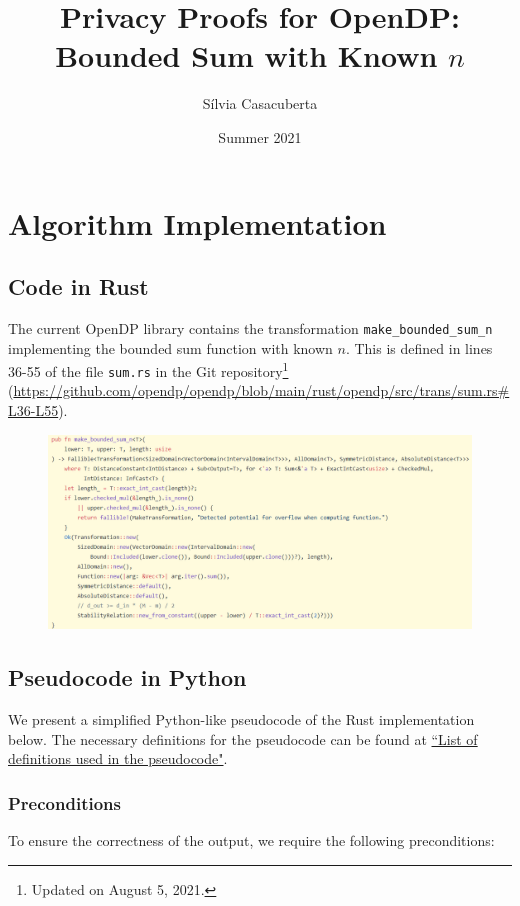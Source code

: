 \documentclass[11pt,a4paper]{article}
\title{Privacy Proofs for OpenDP: Bounded Sum with Known $n$}
\author{S\'ilvia Casacuberta}
\date{Summer 2021}
\theoremstyle{definition}
\begin{document}
\maketitle

\tableofcontents

\section{Algorithm Implementation}
\subsection{Code in Rust}
The current OpenDP library contains the transformation \texttt{make\_bounded\_sum\_n} implementing the bounded sum function with known $n$. This is defined in lines 36-55 of the file \texttt{sum.rs} in the Git repository\footnote{Updated on August 5, 2021.} (\url{https://github.com/opendp/opendp/blob/main/rust/opendp/src/trans/sum.rs#L36-L55}).

\begin{figure}[ht]
    \includegraphics[width=15cm]{bounded_sum_2.png}
    \centering
    \label{fig:code}
\end{figure}

\subsection{Pseudocode in Python}
We present a simplified Python-like pseudocode of the Rust implementation below. The necessary definitions for the pseudocode can be found at \href{https://www.overleaf.com/project/60d215bf90b337ac02200a99}{``List of definitions used in the pseudocode"}.

\subsubsection*{Preconditions}
To ensure the correctness of the output, we require the following preconditions:
\end{document}
